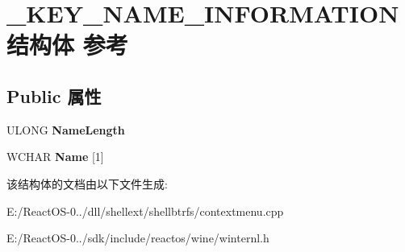 \hypertarget{struct___k_e_y___n_a_m_e___i_n_f_o_r_m_a_t_i_o_n}{}\section{\+\_\+\+K\+E\+Y\+\_\+\+N\+A\+M\+E\+\_\+\+I\+N\+F\+O\+R\+M\+A\+T\+I\+O\+N结构体 参考}
\label{struct___k_e_y___n_a_m_e___i_n_f_o_r_m_a_t_i_o_n}
\subsection*{Public 属性}
\begin{DoxyCompactItemize}
\item 
\mbox{\label{struct___k_e_y___n_a_m_e___i_n_f_o_r_m_a_t_i_o_n_a0a366430dcfefdb0512fe5b83e615e56}} 
U\+L\+O\+NG {\bfseries Name\+Length}
\item 
\mbox{\label{struct___k_e_y___n_a_m_e___i_n_f_o_r_m_a_t_i_o_n_af682a29ef76fee64b7bf9f7ecd258451}} 
W\+C\+H\+AR {\bfseries Name} \mbox{[}1\mbox{]}
\end{DoxyCompactItemize}


该结构体的文档由以下文件生成\+:\begin{DoxyCompactItemize}
\item 
E\+:/\+React\+O\+S-\/0../dll/shellext/shellbtrfs/contextmenu.\+cpp\item 
E\+:/\+React\+O\+S-\/0../sdk/include/reactos/wine/winternl.\+h\end{DoxyCompactItemize}
